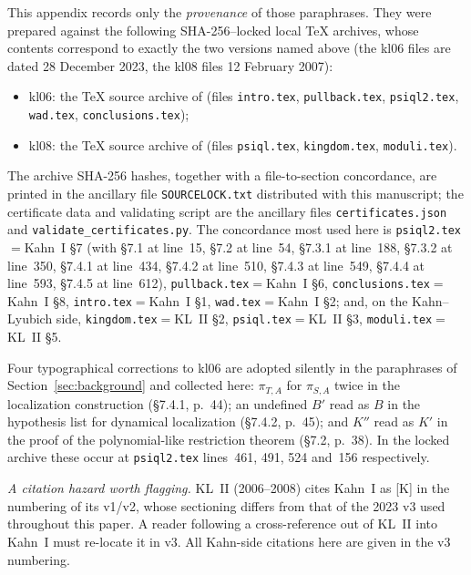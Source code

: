 \documentclass[11pt,reqno]{amsart}
\theoremstyle{definition}
\theoremstyle{remark}
\begin{document}
This appendix records only the \emph{provenance} of those paraphrases.
They were prepared against the following SHA-256--locked local \TeX{}
archives, whose contents correspond to exactly the two versions named
above (the \textsf{kl06} files are dated 28 December 2023, the
\textsf{kl08} files 12 February 2007):
\begin{itemize}
\item \textsf{kl06}: the \TeX{} source archive of
  \cite{KahnPrimitive06} (files \texttt{intro.tex},
  \texttt{pullback.tex}, \texttt{psiql2.tex}, \texttt{wad.tex},
  \texttt{conclusions.tex});
\item \textsf{kl08}: the \TeX{} source archive of
  \cite{KLDecorations08} (files \texttt{psiql.tex},
  \texttt{kingdom.tex}, \texttt{moduli.tex}).
\end{itemize}
The archive SHA-256 hashes, together with a file-to-section
concordance, are printed in the ancillary file
\texttt{SOURCELOCK.txt} distributed with this manuscript; the
certificate data and validating script are the ancillary files
\texttt{certificates.json} and \texttt{validate\_certificates.py}.
The concordance most used here is
\texttt{psiql2.tex}${}={}$Kahn~I \S7 (with \S7.1 at line~15, \S7.2 at
line~54, \S7.3.1 at line~188, \S7.3.2 at line~350, \S7.4.1 at
line~434, \S7.4.2 at line~510, \S7.4.3 at line~549, \S7.4.4 at
line~593, \S7.4.5 at line~612), \texttt{pullback.tex}${}={}$Kahn~I \S6,
\texttt{conclusions.tex}${}={}$Kahn~I \S8, \texttt{intro.tex}${}={}$Kahn~I
\S1, \texttt{wad.tex}${}={}$Kahn~I \S2; and, on the Kahn--Lyubich side,
\texttt{kingdom.tex}${}={}$KL~II \S2, \texttt{psiql.tex}${}={}$KL~II \S3,
\texttt{moduli.tex}${}={}$KL~II \S5.

Four typographical corrections to \textsf{kl06} are adopted silently
in the paraphrases of Section~\ref{sec:background} and collected
here: $\pi_{T,A}$ for $\pi_{S,A}$ twice in the localization
construction (\S7.4.1, p.~44); an undefined $B'$ read as $B$ in the
hypothesis list for dynamical localization (\S7.4.2, p.~45); and $K''$
read as $K'$ in the proof of the polynomial-like restriction theorem
(\S7.2, p.~38).  In the locked archive these occur at
\texttt{psiql2.tex} lines~461, 491, 524 and~156 respectively.

\emph{A citation hazard worth flagging.}  KL~II (2006--2008) cites
Kahn~I as [K] in the numbering of its v1/v2, whose sectioning differs
from that of the 2023 v3 used throughout this paper.  A reader
following a cross-reference out of KL~II into Kahn~I must re-locate it
in v3.  All Kahn-side citations here are given in the v3 numbering.



\end{document}
